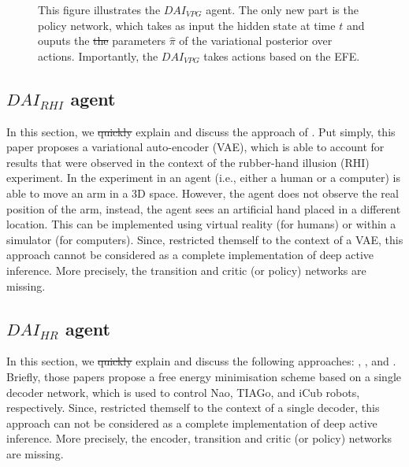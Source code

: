\documentclass[twoside,11pt]{article}
\providecommand{\DIFadd}[1]{{\protect\color{blue}\uwave{#1}}} %
\providecommand{\DIFdel}[1]{{\protect\color{red}\sout{#1}}}                      %
\providecommand{\DIFaddbegin}{} %
\providecommand{\DIFaddend}{} %
\providecommand{\DIFdelbegin}{} %
\providecommand{\DIFdelend}{} %
\providecommand{\DIFdelFL}[1]{\DIFdel{#1}} %
\providecommand{\DIFaddendFL}{} %
\providecommand{\DIFdelbeginFL}{} %
\providecommand{\DIFdelendFL}{} %
\begin{document}
\begin{figure}[H]
\begin{center}
	\DIFaddendFL \end{center}
  \caption{This figure illustrates the $DAI_{VPG}$ agent. The only new part is the policy network, which takes as input the hidden state at time $t$ and ouputs the \DIFdelbeginFL \DIFdelFL{the }\DIFdelendFL parameters $\hat{\pi}$ of the variational posterior over actions. Importantly, the $DAI_{VPG}$ takes actions based on the EFE.}
   \label{fig:DAI_VPG_agent}
\end{figure}

\subsection{$DAI_{RHI}$ agent \citep{rood2020deep}}

In this section, we \DIFdelbegin \DIFdel{quickly }\DIFdelend explain and discuss the approach of \citet{rood2020deep}. Put simply, this paper proposes a variational auto-encoder (VAE), which is able to account for results that were observed in the context of the rubber-hand illusion (RHI) experiment. In the experiment in \citet{rood2020deep}\DIFaddbegin \DIFadd{, }\DIFaddend an agent (i.e., either a human or a computer) is able to move an arm in a 3D space. However, the agent does not observe the real position of the arm, instead, the agent sees an artificial hand placed in a different location. This can be implemented using virtual reality (for humans) or within a simulator (for computers). Since, \citet{rood2020deep} restricted themself to the context of a VAE, this approach cannot be considered as a complete implementation of deep active inference. More precisely, the transition and critic (or policy) networks are missing.

\subsection{$DAI_{HR}$ agent \citep{sancaktar2020endtoend,DAI_HR,DAI_HR2}}

In this section, we \DIFdelbegin \DIFdel{quickly }\DIFdelend explain and discuss the following approaches: \citet{sancaktar2020endtoend}, \citet{DAI_HR}, and \citet{DAI_HR2}. Briefly, those papers propose a free energy minimisation scheme based on a single decoder network, which is used to control Nao, TIAGo, and iCub robots, respectively. Since, \citet{sancaktar2020endtoend,DAI_HR,DAI_HR2} restricted themself to the context of a single decoder, this approach can not be considered as a complete implementation of deep active inference. More precisely, the encoder, transition and critic (or policy) networks are missing.
\end{document}

